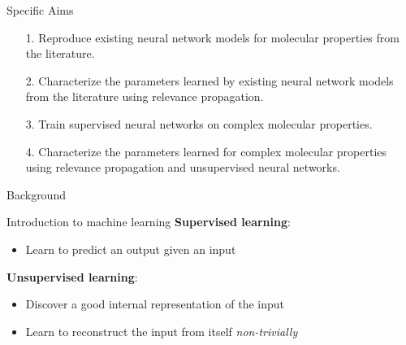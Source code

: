 \documentclass[xetex,compress]{beamer}
\begin{document}
\begin{frame}{Specific Aims}
  \begin{itemize}
  \item[1.] Reproduce existing neural network models for molecular properties from the literature.
  \item[2.] Characterize the parameters learned by existing neural network models from the literature using relevance propagation.
  \item[3.] Train supervised neural networks on complex molecular properties.
  \item[4.] Characterize the parameters learned for complex molecular properties using relevance propagation and unsupervised neural networks.
  \end{itemize}
\end{frame}


\begin{frame}{Background}
\end{frame}

\begin{frame}{Introduction to machine learning}
  \textbf{Supervised learning}:
  \begin{itemize}
  \item Learn to predict an output given an input
  \end{itemize}
  \textbf{Unsupervised learning}:
  \begin{itemize}
  \item Discover a good internal representation of the input
  \item Learn to reconstruct the input from itself \emph{non-trivially}
  \end{itemize}
\end{frame}
\end{document}
